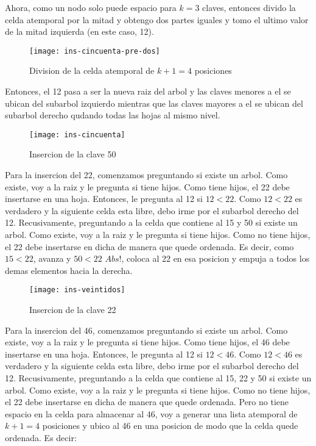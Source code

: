 \documentclass[10pt,a4paper]{article}
\begin{document}
Ahora, como un nodo solo puede espacio para $k = 3$ claves, entonces divido la celda atemporal por la mitad y obtengo dos partes iguales y tomo el ultimo valor de la mitad izquierda (en este caso, 12).

\begin{figure}[h]
\centering
\texttt{[image: ins-cincuenta-pre-dos]}
\caption{Division de la celda atemporal de $k+1 = 4$ posiciones}
\label{drivers1}
\end{figure}
\newpage

Entonces, el 12 pasa a ser la nueva raiz del arbol y las claves menores a el se ubican del subarbol izquierdo mientras que las claves mayores a el se ubican del subarbol derecho qudando todas las hojas al mismo nivel.

\begin{figure}[h]
\centering
\texttt{[image: ins-cincuenta]}
\caption{Insercion de la clave 50}
\label{drivers1}
\end{figure}

Para la insercion del 22, comenzamos preguntando si existe un arbol. Como existe, voy a la raiz y le pregunta si tiene hijos. Como tiene hijos, el 22 debe insertarse en una hoja. Entonces, le pregunta al 12 si $12 < 22$.
\newline
\newline
Como $12 < 22$ es verdadero y la siguiente celda esta libre, debo irme por el subarbol derecho del 12. Recusivamente, preguntando a la celda que contiene al 15 y 50 si existe un arbol. Como existe, voy a la raiz y le pregunta si tiene hijos. Como no tiene hijos, el 22 debe insertarse en dicha de manera que quede ordenada. Es decir, como $15 < 22$, avanza y $50 < 22$ $Abs!$, coloca al 22 en esa posicion y empuja a todos los demas elementos hacia la derecha.

\begin{figure}[h]
\centering
\texttt{[image: ins-veintidos]}
\caption{Insercion de la clave 22}
\label{drivers1}
\end{figure}

Para la insercion del 46, comenzamos preguntando si existe un arbol. Como existe, voy a la raiz y le pregunta si tiene hijos. Como tiene hijos, el 46 debe insertarse en una hoja. Entonces, le pregunta al 12 si $12 < 46$.
\newline
\newline
Como $12 < 46$ es verdadero y la siguiente celda esta libre, debo irme por el subarbol derecho del 12. Recusivamente, preguntando a la celda que contiene al 15, 22 y 50 si existe un arbol. Como existe, voy a la raiz y le pregunta si tiene hijos. Como no tiene hijos, el 22 debe insertarse en dicha de manera que quede ordenada. Pero no tiene espacio en la celda para almacenar al 46, voy a generar una lista atemporal de $k+1 = 4$ posiciones y ubico al 46 en una posicion de modo que la celda quede ordenada. Es decir:
\end{document}
